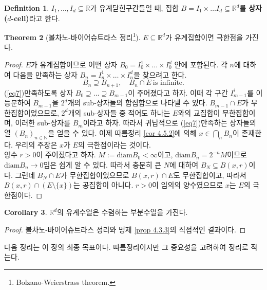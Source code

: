 \documentclass[11pt]{book}
\numberwithin{equation}{chapter}
\def\NN{\mathbb{N}}
\def\RR{\mathbb{R}}
\def\diam{\text{diam}}
\theoremstyle{definition}
\newtheorem{thm}{Theorem}[section]
\newtheorem{cor}[thm]{Corollary}
\newtheorem{defn}[thm]{Definition}
\begin{document}
\begin{defn}
    \(I_1, \ldots, I_d \subseteq \RR\)가 유계닫힌구간들일 때, 집합 \(B = I_1 \times \ldots I_d \subseteq \RR^d\)를 \textbf{상자(\(d\)-cell)}라고 한다.
\end{defn}

\begin{thm} [볼차노-바이어슈트라스 정리\footnote{Bolzano-Weierstrass theorem.}]
    \(E \subseteq \RR^d\)가 유계집합이면 극한점을 가진다.
\end{thm}
\begin{proof}
    \(E\)가 유계집합이므로 어떤 상자 \(B_0 = I_0^1 \times \ldots \times I_0^d\) 안에 포함된다. 각 \(n\)에 대하여 다음을 만족하는 상자 \(B_n = I_n^1 \times \ldots \times I_n^d\)을 찾으려고 한다.
    \begin{equation} \label{eq7}
        B_n \supseteq B_{n+1}, \quad B_n \cap E \ \text{is infinite.}
    \end{equation}
    (\ref{eq7})\을 만족하도록 상자 \(B_0 \supseteq \ldots \supseteq B_{m-1}\)이 주어졌다고 하자. 이때 각 구간 \(I_{m-1}^i\)를 이등분하여 \(B_{m-1}\)을 \(2^d\)개의 sub-상자들의 합집합으로 나타낼 수 있다. \(B_{m-1} \cap E\)가 무한집합이었으므로, \(2^d\)개의 sub-상자들 중 적어도 하나는 \(E\)와의 교집합이 무한집합이며, 이러한 sub-상자를 \(B_m\)이라고 하자. 따라서 귀납적으로 (\ref{eq7})\을 만족하는 상자들의 열 \((B_n)_{n \in \NN}\)을 얻을 수 있다. 이제 따름정리 \ref{cor 4.5.2}에 의해 \(x \in \bigcap_n B_n\)이 존재한다. 우리의 주장은 \(x\)가 \(E\)의 극한점이라는 것이다.\\
    양수 \(r > 0\)이 주어졌다고 하자. \(M := \diam B_0 < \infty\)이고, \(\diam B_n = 2^{-n} M\)이므로 \(\diam B_n \to 0\)임은 쉽게 알 수 있다. 따라서 충분히 큰 \(N\)에 대하여 \(B_N \subseteq B(x, r)\)이다. 그런데 \(B_N \cap E\)가 무한집합이었으므로 \(B(x, r) \cap E\)도 무한집합이고, 따라서 \(B(x, r) \cap (E \setminus \{x\})\)는 공집합이 아니다. \(r > 0\)이 임의의 양수였으므로 \(x\)는 \(E\)의 극한점이다. 
\end{proof}

\begin{cor} \label{cor 4.5.5}
    \(\RR^d\)의 유계수열은 수렴하는 부분수열을 가진다.
\end{cor}
\begin{proof}
    볼차노-바이어슈트라스 정리와 명제 \ref{prop 4.3.3}의 직접적인 결과이다.
\end{proof}

다음 정리는 이 장의 최종 목표이다. 따름정리이지만 그 중요성을 고려하여 정리로 적는다.
\end{document}
